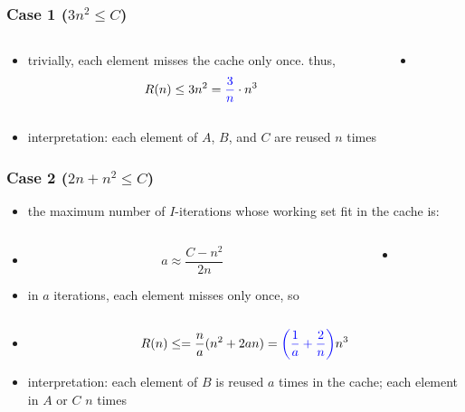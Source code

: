 \documentclass[12pt,dvipdfmx]{beamer}
\newcommand{\ao}[1]{{\color{blue}#1}}
\begin{document}
\begin{frame}[fragile]
\frametitle{Case 1 ($3n^2 \leq C$)}
\begin{columns}
  \begin{column}{0.5\textwidth}
\begin{itemize}
\item trivially, each element misses the cache only once. thus,
  \[ R(n) \leq 3n^2 = \ao{\frac{3}{n}} \cdot n^3 \]
\end{itemize}
\end{column}

\begin{column}{0.5\textwidth}
  \begin{itemize}
  \item []
{\tiny\def\svgwidth{0.9\textwidth}
}
\end{itemize}
\end{column}
\end{columns}

\begin{itemize}
\item 
\ao{interpretation:} each element of $A$, $B$, and $C$ are reused $n$ times
\end{itemize}
\end{frame}


\begin{frame}[fragile]
\frametitle{Case 2 ($2n + n^2 \leq C$)}
\begin{itemize}
\item the maximum number of $I$-iterations whose working set fit in the cache is:
\end{itemize}
\begin{columns}
  \begin{column}{0.5\textwidth}
\begin{itemize}
\item []      
\[ a \approx \frac{C - n^2}{2n} \]
\item in $a$ iterations, each element misses only once, so
\end{itemize}
\end{column}

\begin{column}{0.5\textwidth}
  \begin{itemize}
  \item []
{\tiny\def\svgwidth{0.9\textwidth}
}
\end{itemize}
\end{column}
\end{columns}

\begin{itemize}
\item []
\[ R(n) \leq 
= \frac{n}{a} (n^2 + 2an)
= \ao{\left(\frac{1}{a}+\frac{2}{n}\right)} n^3
\]
\item
\ao{interpretation:} each element of $B$ is reused $a$ times in the cache;
each element in $A$ or $C$ $n$ times 
\end{itemize}
\end{frame}
\end{document}

